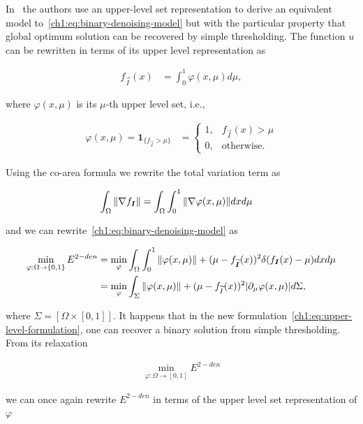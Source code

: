 In~\cite{chan06} the authors use an upper-level set representation to derive an equivalent model to~\cref{ch1:eq:binary-denoising-model} but with the particular property that global  optimum solution can be recovered by simple thresholding. The function $u$ can be rewritten in terms of its upper level representation as

\begin{align*}
	f_{\vec{I}}(x) &= \int_{0}^{1}{\varphi (x,\mu)d\mu},
\end{align*}

where $\varphi(x,\mu)$ is its $\mu$-th upper level set, i.e.,

\begin{align*}
\varphi(x,\mu) = \mathbf{1}_{\{f_{\vec{I}} > \mu\}} &= \left\{ \begin{array}{ll}
	1,& f_{\vec{I}}(x) > \mu \\
	0,& \text{otherwise}.
	\end{array}\right.
\end{align*}

Using the co-area formula we rewrite the total variation term as

\begin{align*}
	\int_{\Omega}{ \lVert \nabla f_{\bm{I}} \rVert } &= \int_{\Omega}{ \int_{0}^{1}{ \lVert \nabla \varphi (x,\mu) \rVert dxd\mu }}
\end{align*}


and we can rewrite~\cref{ch1:eq:binary-denoising-model} as

\begin{align}
	\min_{\varphi:\Omega \rightarrow \{0,1\} }E^{2-den} &= \min_{\varphi} \int_{\Omega}{ \int_{0}^{1}{\lVert \varphi(x,\mu)\rVert} } + (\mu -f_{\widetilde{\bm{I}}}(x))^2\delta(f_{\bm{I}}(x)-\mu) dxd\mu \\
	&= \min_{\varphi } \int_{\Sigma}{\lVert \varphi(x,\mu)\rVert + (\mu -f_{\widetilde{I}}(x))^2|\partial_\mu \varphi (x,\mu)|d\Sigma},
	\label{ch1:eq:upper-level-formulation}
\end{align}

where $\Sigma = [\Omega \times [0,1]]$. It happens that in the new formulation~\cref{ch1:eq:upper-level-formulation}, one can recover a binary solution from simple thresholding. From its relaxation 

\begin{align}
	\min_{\varphi:\Omega \rightarrow [0,1] }E^{2-den}
	\label{ch1:eq:relaxed-binary-denoising}
\end{align}

we can once again rewrite $E^{2-den}$ in terms of the upper level set representation of $\varphi$ 

